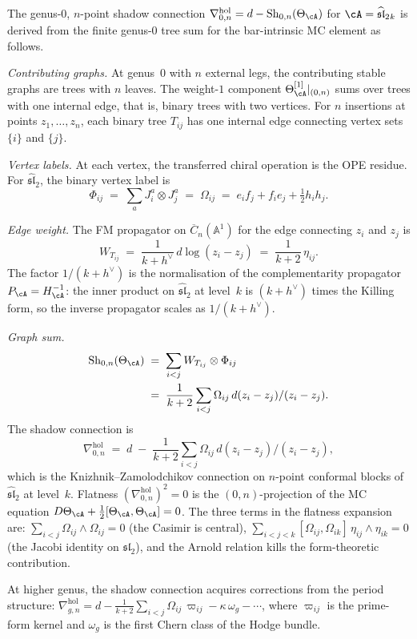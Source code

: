 \begin{computation}
\label{comp:kz-from-graph-sum}
The genus-$0$, $n$-point shadow connection
$\nabla^{\mathrm{hol}}_{0,n}=d-\mathrm{Sh}_{0,n}(\Theta_\cA)$
for $\cA=\widehat{\mathfrak{sl}}_2{}_k$ is derived from the
finite genus-$0$ tree sum for the bar-intrinsic MC element as follows.

\emph{Contributing graphs.}
At genus~$0$ with $n$ external legs, the contributing stable
graphs are trees with $n$ leaves. The weight-$1$ component
$\Theta^{[1]}_\cA|_{(0,n)}$ sums over trees with one internal
edge, that is, binary trees with two vertices. For $n$ insertions at
points $z_1,\dots,z_n$, each binary tree $T_{ij}$ has one
internal edge connecting vertex sets $\{i\}$ and $\{j\}$.

\emph{Vertex labels.}
At each vertex, the transferred chiral operation is the OPE
residue. For $\widehat{\mathfrak{sl}}_2$, the binary vertex
label is
\[
\Phi_{ij}
\;=\;
\sum_{a} J^a_i \otimes J^a_j
\;=\;
\Omega_{ij}
\;=\;
e_i f_j + f_i e_j + \tfrac{1}{2}h_i h_j.
\]

\emph{Edge weight.}
The FM propagator on $\overline{C}_n(\mathbb{A}^1)$ for the
edge connecting $z_i$ and $z_j$ is
\[
W_{T_{ij}}
\;=\;
\frac{1}{k+h^\vee}\,d\log(z_i-z_j)
\;=\;
\frac{1}{k+2}\,\eta_{ij}.
\]
The factor $1/(k+h^\vee)$ is the normalisation of the
complementarity propagator $P_\cA=H_\cA^{-1}$: the inner
product on $\widehat{\mathfrak{sl}}_2$ at level~$k$ is
$(k+h^\vee)$ times the Killing form, so the inverse
propagator scales as $1/(k+h^\vee)$.

\emph{Graph sum.}
\begin{align*}
\mathrm{Sh}_{0,n}(\Theta_\cA)
&\;=\;
\sum_{i<j}
W_{T_{ij}}\otimes\Phi_{ij}
\\
&\;=\;
\frac{1}{k+2}\sum_{i<j}
\Omega_{ij}\,d(z_i-z_j)/(z_i-z_j).
\end{align*}
The shadow connection is
\[
\boxed{
\nabla^{\mathrm{hol}}_{0,n}
\;=\;
d
\;-\;
\frac{1}{k+2}\sum_{i<j}
\Omega_{ij}\,d(z_i-z_j)/(z_i-z_j),}
\]
which is the Knizhnik--Zamolodchikov connection on
$n$-point conformal blocks of $\widehat{\mathfrak{sl}}_2$
at level~$k$. Flatness
$(\nabla^{\mathrm{hol}}_{0,n})^2=0$ is the
$(0,n)$-projection of the MC equation
$D\Theta_\cA+\tfrac12[\Theta_\cA,\Theta_\cA]=0$.
The three terms in the flatness expansion are:
$\sum_{i<j}\Omega_{ij}\wedge\Omega_{ij}=0$ (the Casimir is
central), $\sum_{i<j<k}[\Omega_{ij},\Omega_{ik}]\,
\eta_{ij}\wedge\eta_{ik}=0$ (the Jacobi identity on
$\mathfrak{sl}_2$), and the Arnold relation kills the
form-theoretic contribution.

At higher genus, the shadow connection acquires corrections
from the period structure:
$\nabla^{\mathrm{hol}}_{g,n}
=d-\frac{1}{k+2}\sum_{i<j}\Omega_{ij}\,\varpi_{ij}
-\kappa\,\omega_g-\cdots$,
where $\varpi_{ij}$ is the prime-form kernel and $\omega_g$
is the first Chern class of the Hodge bundle.
\end{computation}

